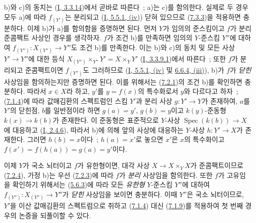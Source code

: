 b)와 c)의 동치는 (\hyperref[I.3.3.14-ko]{I, 3.3.14})에서 곧바로
따른다~; a)는 c)를 함의한다. 실제로 두 경우 모두 a)에 따라
$f_{(Y')}$는 분리되고
(\hyperref[I.5.5.1-ko]{I, 5.5.1, (iv)}) 닫혀 있으므로
(\hyperref[II.7.3.3-ko]{7.3.3})을 적용하면 충분하다. 이제 b)가 a)를
함의함을 증명하면 된다. 먼저 $Y$가 임의의 준스킴이고 $f$가 분리
준콤팩트 사상인 경우를 생각하자. $f$가 조건 b)를 만족하면 임의의
$Y$-준스킴 $Y''$에 대하여 $f_{(Y'')}:X_{(Y'')}\to Y''$도 조건 b)를
만족한다. 이는 b)와 c)의 동치 및 모든 사상 $Y'\to Y''$에 대한 등식
$X_{(Y'')}\times_{Y''}Y'=X\times_YY'$
(\hyperref[I.3.3.9.1-ko]{I, 3.3.9.1})에서 따른다~; 또한 $f$가 분리되고
준콤팩트이면 $f_{(Y'')}$도 그러하므로
(\hyperref[I.5.5.1-ko]{I, 5.5.1, (iv)} 및
\hyperref[I.6.6.4-ko]{6.6.4, (iii)}), b)가 $f$가 \emph{닫힌}
사상임을 함의하는지만 증명하면 된다. 이를 위해서는
(\hyperref[II.7.2.1-ko]{7.2.1})의 조건 b)를 확인하면 충분하다. 따라서
$x\in X$라 하고, $y'$를 $y=f(x)$의 특수화로서 $y$와 다르다고 하자~;
(\hyperref[II.7.1.4-ko]{7.1.4})에 따라 값매김환의 스펙트럼인 스킴
$Y'$과 분리 사상 $g:Y'\to Y$가 존재하여, $a$를 $Y'$의 닫힌점, $b$를
일반점이라 하면 $g(a)=y'$, $g(b)=y$이고 $k(y)$-준동형
$k(x)\to k(b)$가 존재한다. 이 준동형은 표준적으로 $Y$-사상
$\operatorname{Spec}(k(b))\to X$에 대응하고
(\hyperref[I.2.4.6-ko]{I, 2.4.6}), 따라서 b)에 의해 앞의 사상에
대응하는 $Y$-사상 $h:Y'\to X$가 존재한다. 그러면 $h(b)=x$이다~;
$h(a)=x'$로 놓으면 $x'$은 $x$의 특수화이고
$f(x')=f(h(a))=g(a)=y'$이다.

이제 $Y$가 국소 뇌터이고 $f$가 유한형이면, 대각 사상
$X\to X\times_YX$가 준콤팩트이므로
(\hyperref[II.7.2.4-ko]{7.2.4}), 가정 b)는 우선
(\hyperref[II.7.2.3-ko]{7.2.3})에 따라 $f$가 \emph{분리} 사상임을
함의한다. 또한 $f$가 고유임을 확인하기 위해서는
(\hyperref[II.5.6.3-ko]{5.6.3})에 따라 모든 \emph{유한형}
$Y$-준스킴 $Y''$에 대하여 $f_{(Y'')}:X_{(Y'')}\to Y''$가
\emph{닫힌} 사상임을 보이면 충분하다. 이때 $Y''$은 국소 뇌터이므로,
$Y'$을 이산 값매김환의 스펙트럼으로 취하고
(\hyperref[II.7.1.4-ko]{7.1.4}) 대신
(\hyperref[II.7.1.9-ko]{7.1.9})를 적용하여 첫 번째 경우의 논증을
되풀이할 수 있다.

